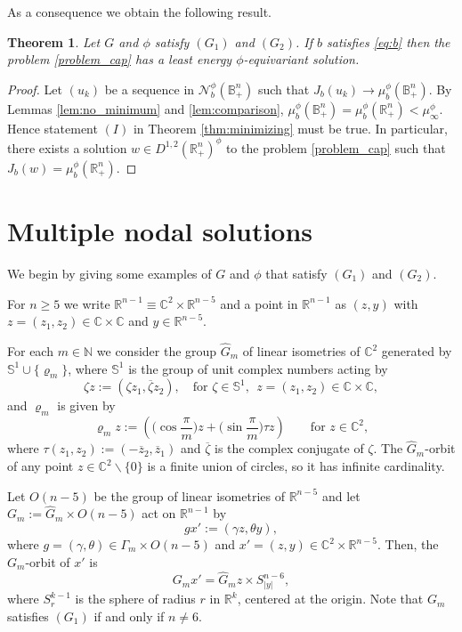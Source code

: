 \documentclass[reqno,11pt,oneside]{amsart}
\newtheorem{theorem}{Theorem}[section]
\numberwithin{equation}{section}
\def\D{\mathbb{B}^n_+}
\def\r{\mathbb{R}}
\def\hn{\mathbb{R}^n_+}
\def\n{\mathbb{N}}
\def\cc{\mathbb{C}}
\def\vr{\varrho}
\def\cN{\mathcal{N}}
\def\what{\widehat}
\begin{document}
As a consequence we obtain the following result.

\begin{theorem} \label{thm:existence}
Let $G$ and $\phi$ satisfy $(G_1)$ and $(G_2)$. If $b$ satisfies \eqref{eq:b} then the problem \eqref{problem_cap} has a least energy $\phi$-equivariant solution.
\end{theorem}

\begin{proof}
Let $(u_k)$ be a sequence in $\cN_b^\phi(\D)$ such that $J_b(u_k)\to \mu^\phi_b(\D)$. By Lemmas \ref{lem:no_minimum} and \ref{lem:comparison}, $\mu^\phi_b(\D)=\mu^\phi_b(\hn)<\mu^\phi_\infty$. Hence statement $(I)$ in Theorem \ref{thm:minimizing} must be true. In particular, there exists a solution $w\in D^{1,2}(\hn)^\phi$ to the problem \eqref{problem_cap} such that
$J_b(w)=\mu^\phi_b(\hn)$.
\end{proof}

\section{Multiple nodal solutions}
\label{sec:proof}

We begin by giving some examples of $G$ and $\phi$ that satisfy $(G_1)$ and $(G_2)$.

For $n\geq 5$ we write $\r^{n-1}\equiv\cc^2\times\r^{n-5}$ and a point in $\r^{n-1}$ as $(z,y)$ with $z=(z_1,z_2)\in\cc\times\cc$ and $y\in\r^{n-5}$. 

For each $m\in\n$ we consider the group $\what G_m$ of linear isometries of $\cc^2$ generated by $\mathbb{S}^1\cup\{\vr_m\}$, where $\mathbb{S}^1$ is the group of unit complex numbers acting by 
\begin{equation*}
\zeta z:=(\zeta z_1,\overline{\zeta}z_2),\quad\text{for \ }\zeta\in \mathbb{S}^1, \ \ z=(z_1,z_2)\in\cc\times\cc,
\end{equation*}
and $\vr_m$ is given by 
\begin{equation*}\label{eq:rho}
\vr_mz:=\left(\Big(\cos\frac{\pi}{m}\Big)z+\Big(\sin\frac{\pi}{m}\Big)\tau z\right)\qquad\text{for \ }z\in\cc^2,
\end{equation*}
where $\tau(z_1,z_2):=(-\overline{z}_2,\overline{z}_1)$ and $\overline{\zeta}$ is the complex conjugate of $\zeta$. The $\what G_m$-orbit of any point $z\in\cc^2\smallsetminus\{0\}$ is a finite union of circles, so it has infinite cardinality.

Let $O(n-5)$ be the group of linear isometries of $\r^{n-5}$ and let $G_m:=\what G_m\times O(n-5)$ act on $\r^{n-1}$ by
\begin{equation} \label{eq:action}
gx':=(\gamma z,\theta y),
\end{equation}
where $g=(\gamma,\theta)\in \Gamma_m\times O(n-5)$ and $x'=(z,y)\in\cc^2\times\r^{n-5}$. Then, the $G_m$-orbit of $x'$ is 
$$G_mx'=\what G_mz\times S^{n-6}_{|y|},$$
where $S^{k-1}_r$ is the sphere of radius $r$ in $\r^k$, centered at the origin. Note that $G_m$ satisfies $(G_1)$ if and only if $n\neq 6$.
\end{document}
